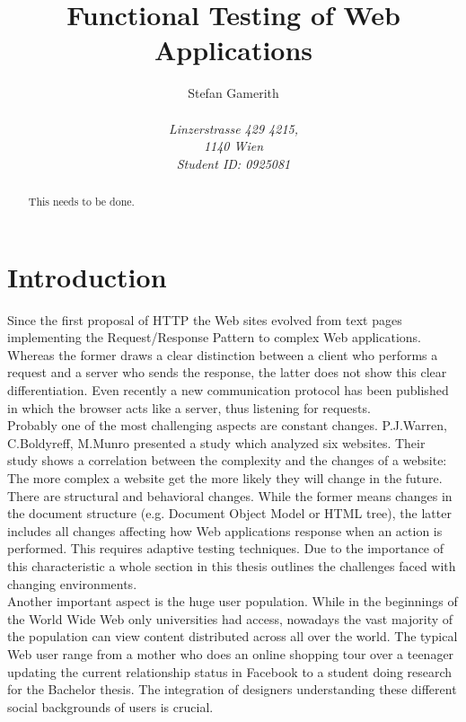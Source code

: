 \documentclass[12pt, notitlepage]{article}
\title{Functional Testing of Web Applications}
\author{Stefan Gamerith\\\\
		\emph{Linzerstrasse 429 4215,}\\
		\emph{1140 Wien}\\
		\emph{Student ID: 0925081}}
\begin{document}
	\maketitle
	
	\begin{abstract}
		This needs to be done.
	\end{abstract}
	
	\tableofcontents
	
\section*{Introduction}
Since the first proposal of HTTP\cite{http-proposal} the Web sites evolved from 
text pages implementing the Request/Response Pattern\cite{request-response}  to  
complex Web applications. Whereas the former draws a clear distinction between a client
who performs a request and a server who sends the response, the latter does not show this 
clear differentiation. Even recently a new communication protocol\cite{web-socket} has been published 
in which the browser acts like a server, thus listening for requests. \\
 
Probably one of the most challenging aspects are constant changes. P.J.Warren, C.Boldyreff, M.Munro \cite{html-evolution}
presented a study which analyzed six websites. Their study shows a correlation between the complexity and the changes of
a website: The more complex a website get the more likely they will change in the future. 
There are structural and behavioral changes. While the former means changes in the document structure (e.g. Document Object Model\cite{dom} or HTML tree), the latter
includes all changes affecting how Web applications response when an action is performed. 
This requires adaptive testing techniques. Due to the importance of this characteristic a whole section in this thesis outlines the challenges faced
with changing environments.\\ 

Another important aspect is the huge user population. While in the beginnings of the World Wide Web only universities had access,
nowadays the vast majority of the population can view content distributed across all over the world. The typical Web user range from a
mother who does an online shopping tour over a teenager updating the current relationship status in Facebook to a student doing research for
the Bachelor thesis. The integration of designers understanding these different social backgrounds of users is crucial. \\
\end{document}
